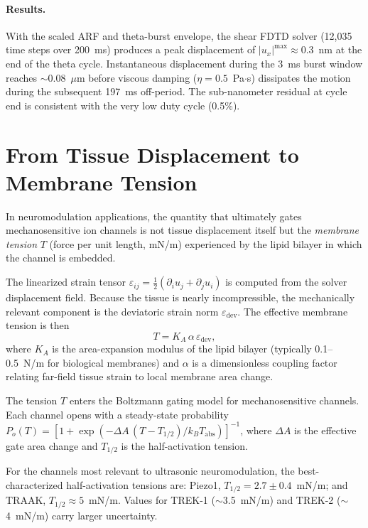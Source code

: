 \documentclass[11pt]{article}
\begin{document}
\paragraph{Results.}
With the scaled ARF and theta-burst envelope, the shear FDTD solver (12{,}035
time steps over 200~ms) produces a peak displacement of
$|u_x|^{\max} \approx 0.3$~nm at the end of the theta cycle. Instantaneous
displacement during the 3~ms burst window reaches ${\sim}$0.08~$\mu$m before
viscous damping ($\eta = 0.5$~Pa$\cdot$s) dissipates the motion during the
subsequent 197~ms off-period. The sub-nanometer residual at cycle end is
consistent with the very low duty cycle (0.5\%).


\section{From Tissue Displacement to Membrane Tension}
\label{sec:supp_membrane_tension}

In neuromodulation applications, the quantity that ultimately gates
mechanosensitive ion channels is not tissue displacement itself but the
\emph{membrane tension} $T$ (force per unit length, mN/m) experienced by the
lipid bilayer in which the channel is embedded.

The linearized strain tensor
$\varepsilon_{ij} = \tfrac{1}{2}(\partial_i u_j + \partial_j u_i)$ is computed
from the solver displacement field. Because the tissue is nearly
incompressible, the mechanically relevant component is the deviatoric strain
norm $\varepsilon_{\mathrm{dev}}$. The effective membrane tension is then
\begin{equation}
    T = K_A \,\alpha\, \varepsilon_{\mathrm{dev}},
    \label{eq:tension}
\end{equation}
where $K_A$ is the area-expansion modulus of the lipid bilayer (typically
0.1--0.5~N/m for biological membranes) and $\alpha$ is a dimensionless
coupling factor relating far-field tissue strain to local membrane area change.

The tension $T$ enters the Boltzmann gating model for mechanosensitive
channels. Each channel opens with a steady-state probability
$P_o(T) = [1 + \exp(-\Delta A\,(T - T_{1/2})/k_BT_{\mathrm{abs}})]^{-1}$,
where $\Delta A$ is the effective gate area change and $T_{1/2}$ is the
half-activation tension.

For the channels most relevant to ultrasonic neuromodulation, the
best-characterized half-activation tensions are: Piezo1,
$T_{1/2} = 2.7 \pm 0.4$~mN/m; and TRAAK, $T_{1/2} \approx 5$~mN/m. Values
for TREK-1 (${\sim}$3.5~mN/m) and TREK-2 (${\sim}$4~mN/m) carry larger
uncertainty.
\end{document}
